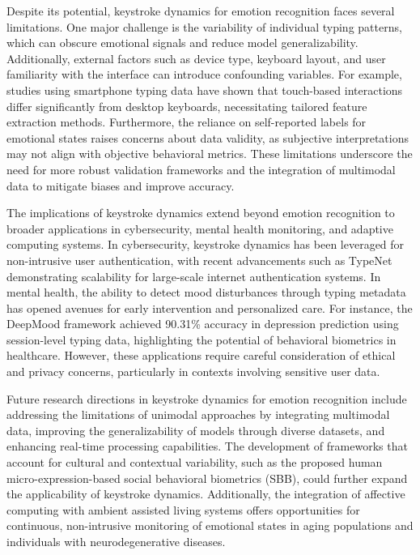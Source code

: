 \documentclass[conference]{IEEEtran}
\begin{document}
Despite its potential, keystroke dynamics for emotion recognition faces several limitations. One major challenge is the variability of individual typing patterns, which can obscure emotional signals and reduce model generalizability. Additionally, external factors such as device type, keyboard layout, and user familiarity with the interface can introduce confounding variables. For example, studies using smartphone typing data have shown that touch-based interactions differ significantly from desktop keyboards, necessitating tailored feature extraction methods. Furthermore, the reliance on self-reported labels for emotional states raises concerns about data validity, as subjective interpretations may not align with objective behavioral metrics. These limitations underscore the need for more robust validation frameworks and the integration of multimodal data to mitigate biases and improve accuracy.  

The implications of keystroke dynamics extend beyond emotion recognition to broader applications in cybersecurity, mental health monitoring, and adaptive computing systems. In cybersecurity, keystroke dynamics has been leveraged for non-intrusive user authentication, with recent advancements such as TypeNet demonstrating scalability for large-scale internet authentication systems. In mental health, the ability to detect mood disturbances through typing metadata has opened avenues for early intervention and personalized care. For instance, the DeepMood framework achieved 90.31\% accuracy in depression prediction using session-level typing data, highlighting the potential of behavioral biometrics in healthcare. However, these applications require careful consideration of ethical and privacy concerns, particularly in contexts involving sensitive user data.  

Future research directions in keystroke dynamics for emotion recognition include addressing the limitations of unimodal approaches by integrating multimodal data, improving the generalizability of models through diverse datasets, and enhancing real-time processing capabilities. The development of frameworks that account for cultural and contextual variability, such as the proposed human micro-expression-based social behavioral biometrics (SBB), could further expand the applicability of keystroke dynamics. Additionally, the integration of affective computing with ambient assisted living systems offers opportunities for continuous, non-intrusive monitoring of emotional states in aging populations and individuals with neurodegenerative diseases.  
\end{document}
